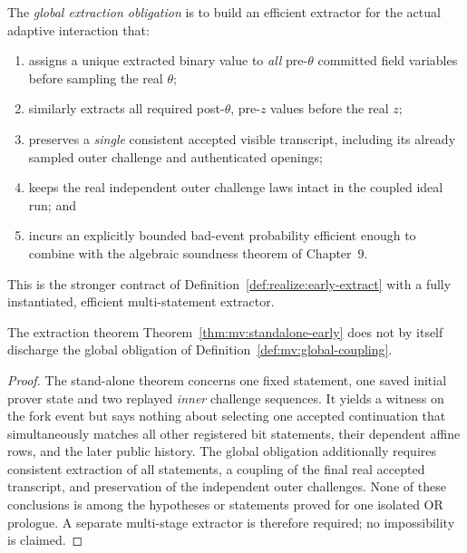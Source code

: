 \begin{definition}\label{def:mv:global-coupling}
The \emph{global extraction obligation}
is to build an efficient extractor for
the actual adaptive interaction that:
\begin{enumerate}[label=\textup{(\roman*)}]
\item assigns a unique extracted binary
value to \emph{all} pre-$\theta$
committed field variables before
sampling the real $\theta$;
\item similarly extracts all required
post-$\theta$, pre-$z$ values before
the real $z$;
\item preserves a \emph{single}
consistent accepted visible transcript,
including its already sampled outer
challenge and authenticated openings;
\item keeps the real independent
outer challenge laws intact in the
coupled ideal run; and
\item incurs an explicitly bounded
bad-event probability efficient enough
to combine with the algebraic
soundness theorem of Chapter~9.
\end{enumerate}
This is the stronger contract of
Definition~\ref{def:realize:early-extract}
with a fully instantiated, efficient
multi-statement extractor.
\end{definition}

\begin{proposition}\label{prop:mv:coupling-open}
The extraction theorem
Theorem~\ref{thm:mv:standalone-early}
does not by itself discharge the
global obligation of
Definition~\ref{def:mv:global-coupling}.
\end{proposition}
\begin{proof}
The stand-alone theorem concerns
one fixed statement, one saved
initial prover state and two
replayed \emph{inner} challenge
sequences. It yields a witness
on the fork event but says
nothing about selecting one
accepted continuation that
simultaneously matches all
other registered bit statements,
their dependent affine rows,
and the later public history.
The global obligation additionally
requires consistent extraction
of all statements, a coupling of
the final real accepted transcript,
and preservation of the independent
outer challenges. None of these
conclusions is among the hypotheses
or statements proved for one
isolated OR prologue. A separate
multi-stage extractor is therefore
required; no impossibility is claimed.
\end{proof}
